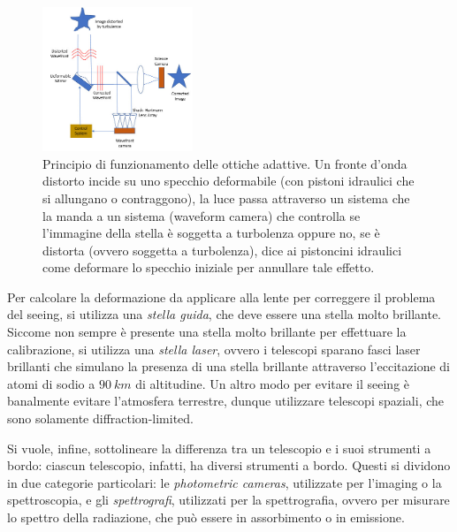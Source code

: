 \begin{figure}
\centering
\includegraphics[width=0.4\textwidth]{immagini/ottiche-adattive.png}
\caption{Principio di funzionamento delle ottiche adattive. Un fronte d’onda distorto incide su uno specchio deformabile (con pistoni idraulici che si allungano o contraggono), la luce passa attraverso un sistema che la manda a un sistema (waveform camera) che controlla se l’immagine della stella è soggetta a turbolenza oppure no, se è distorta (ovvero soggetta a turbolenza), dice ai pistoncini idraulici come deformare lo specchio iniziale per annullare tale effetto.}
\label{fig:ottiche-adattive}
\end{figure}

Per calcolare la deformazione da applicare alla lente per correggere il problema del seeing, si utilizza una \emph{stella guida}, che deve essere una stella molto brillante. Siccome non sempre è presente una stella molto brillante per effettuare la calibrazione, si utilizza una \emph{stella laser}, ovvero i telescopi sparano fasci laser brillanti che simulano la presenza di una stella brillante attraverso l'eccitazione di atomi di sodio a $\SI{90}{km}$ di altitudine. Un altro modo per evitare il seeing è banalmente evitare l'atmosfera terrestre, dunque utilizzare telescopi spaziali, che sono solamente diffraction-limited.

Si vuole, infine, sottolineare la differenza tra un telescopio e i suoi strumenti a bordo: ciascun telescopio, infatti, ha diversi strumenti a bordo. Questi si dividono in due categorie particolari: le \emph{photometric cameras}, utilizzate per l'imaging o la spettroscopia, e gli \emph{spettrografi}, utilizzati per la spettrografia, ovvero per misurare lo spettro della radiazione, che può essere in assorbimento o in emissione.
